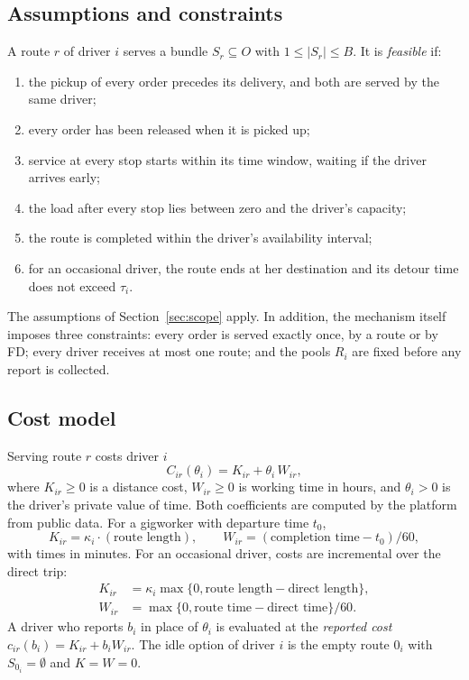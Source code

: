 \subsection{Assumptions and constraints}

A route $r$ of driver $i$ serves a bundle $S_r\subseteq O$ with
$1\le|S_r|\le B$. It is \emph{feasible} if:
\begin{enumerate}[label=(F\arabic*),leftmargin=1.3cm,itemsep=1pt]
\item the pickup of every order precedes its delivery, and both are served
by the same driver;
\item every order has been released when it is picked up;
\item service at every stop starts within its time window, waiting if the
driver arrives early;
\item the load after every stop lies between zero and the driver's capacity;
\item the route is completed within the driver's availability interval;
\item for an occasional driver, the route ends at her destination and its
detour time does not exceed $\tau_i$.
\end{enumerate}
The assumptions of Section~\ref{sec:scope} apply. In addition, the
mechanism itself imposes three constraints: every order is served exactly
once, by a route or by FD; every driver receives at most one route; and the
pools $R_i$ are fixed before any report is collected.

\subsection{Cost model}
\label{sec:sd-costs}

Serving route $r$ costs driver $i$
\begin{equation}
  C_{ir}(\theta_i)=K_{ir}+\theta_i\,W_{ir},
  \label{eq:cost}
\end{equation}
where $K_{ir}\ge 0$ is a distance cost, $W_{ir}\ge 0$ is working time in
hours, and $\theta_i>0$ is the driver's private value of time. Both
coefficients are computed by the platform from public data. For a gigworker
with departure time $t_0$,
\[
K_{ir}=\kappa_i\cdot(\text{route length}),\qquad
W_{ir}=(\text{completion time}-t_0)/60,
\]
with times in minutes. For an occasional driver, costs are incremental over
the direct trip:
\begin{align*}
K_{ir}&=\kappa_i\max\{0,\text{route length}-\text{direct length}\},\\
W_{ir}&=\max\{0,\text{route time}-\text{direct time}\}/60 .
\end{align*}
A driver who reports $b_i$ in place of $\theta_i$ is evaluated at the
\emph{reported cost} $c_{ir}(b_i)=K_{ir}+b_iW_{ir}$. The idle option of
driver $i$ is the empty route $0_i$ with $S_{0_i}=\emptyset$ and $K=W=0$.

